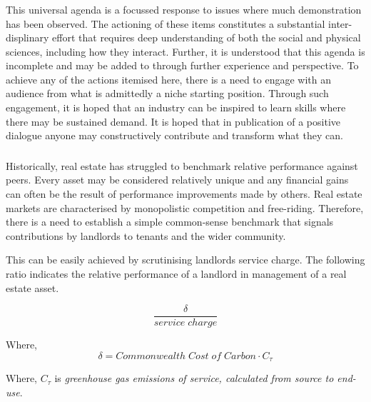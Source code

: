 \documentclass[11pt, oneside]{book}   	%
\begin{document}
\subsubsection{\color{Blue}{P3: Skills Gaps}}
This universal agenda is a focussed response to issues where much demonstration has been observed.
The actioning of these items constitutes a substantial inter-displinary effort that requires deep understanding of both the social and physical sciences, including how they interact.
Further, it is understood that this agenda is incomplete and may be added to through further experience and perspective.
To achieve any of the actions itemised here, there is a need to engage with an audience from what is admittedly a niche starting position.
Through such engagement, it is hoped that an industry can be inspired to learn skills where there may be sustained demand.
It is hoped that in publication of a positive dialogue anyone may constructively contribute and transform what they can.\

\subsubsection{\color{OliveGreen}{P4: Appropriate Real Estate Performance Benchmarking}}
Historically, real estate has struggled to benchmark relative performance against peers.
Every asset may be considered relatively unique and any financial gains can often be the result of performance improvements made by others.
Real estate markets are characterised by monopolistic competition and free-riding.
Therefore, there is a need to establish a simple common-sense benchmark that signals contributions by landlords to tenants and the wider community.\

This can be easily achieved by scrutinising landlords service charge.
The following ratio indicates the relative performance of a landlord in management of a real estate asset.

\begin{equation}
	\frac{\delta}{service\; charge}
\end{equation}

Where,
\begin{equation}
	\delta = Commonwealth\; Cost\; of\; Carbon \cdot C_\tau
\end{equation}

Where, $C_\tau$ is \emph{greenhouse gas emissions of service, calculated from source to end-use}.
\end{document}
